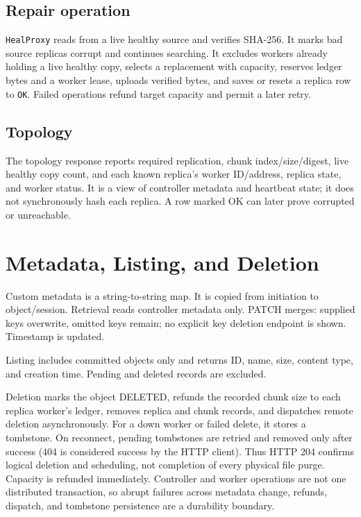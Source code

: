 \documentclass[11pt,a4paper]{article}
\begin{document}
\subsection{Repair operation}
\texttt{HealProxy} reads from a live healthy source and verifies SHA-256. It marks bad source replicas corrupt and continues searching. It excludes workers already holding a live healthy copy, selects a replacement with capacity, reserves ledger bytes and a worker lease, uploads verified bytes, and saves or resets a replica row to \texttt{OK}. Failed operations refund target capacity and permit a later retry.
\subsection{Topology}
The topology response reports required replication, chunk index/size/digest, live healthy copy count, and each known replica's worker ID/address, replica state, and worker status. It is a view of controller metadata and heartbeat state; it does not synchronously hash each replica. A row marked OK can later prove corrupted or unreachable.

\section{Metadata, Listing, and Deletion}
Custom metadata is a string-to-string map. It is copied from initiation to object/session. Retrieval reads controller metadata only. PATCH merges: supplied keys overwrite, omitted keys remain; no explicit key deletion endpoint is shown. Timestamp is updated.

Listing includes committed objects only and returns ID, name, size, content type, and creation time. Pending and deleted records are excluded.

Deletion marks the object DELETED, refunds the recorded chunk size to each replica worker's ledger, removes replica and chunk records, and dispatches remote deletion asynchronously. For a down worker or failed delete, it stores a tombstone. On reconnect, pending tombstones are retried and removed only after success (404 is considered success by the HTTP client). Thus HTTP 204 confirms logical deletion and scheduling, not completion of every physical file purge. Capacity is refunded immediately. Controller and worker operations are not one distributed transaction, so abrupt failures across metadata change, refunds, dispatch, and tombstone persistence are a durability boundary.
\end{document}
